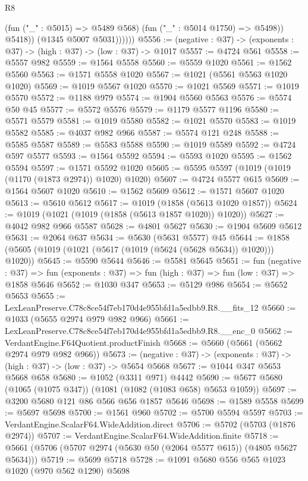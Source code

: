 \begin{lexlean}{R8}
\begin{coremodule}
                    (fun ("_" : @5015) => @5489 @568)
                    (fun ("_" : @5014 @1750) => @5498))
                  @5418))
              (@1345 @5007 @5031))))))
@5556 := (negative : @37) -> (exponents : @37) -> (high : @37) -> (low : @37) -> @1017
@5557 := @4724 @561
@5558 := @5557 @982
@5559 := @1564 @5558
@5560 := @5559 @1020
@5561 := @1562 @5560
@5563 := @1571 @5558 @1020
@5567 := @1021 (@5561 @5563 @1020 @1020)
@5569 := @1019 @5567 @1020
@5570 := @1021 @5569
@5571 := @1019 @5570
@5572 := @1188 @979
@5574 := @1904 @5560 @5563
@5576 := @5574 @50 @45
@5577 := @5572 @5576
@5579 := @1179 @5577 @1196
@5580 := @5571 @5579
@5581 := @1019 @5580
@5582 := @1021 @5570
@5583 := @1019 @5582
@5585 := @4037 @982 @966
@5587 := @5574 @121 @248
@5588 := @5585 @5587
@5589 := @5583 @5588
@5590 := @1019 @5589
@5592 := @4724 @597 @5577
@5593 := @1564 @5592
@5594 := @5593 @1020
@5595 := @1562 @5594
@5597 := @1571 @5592 @1020
@5605 := @5595 @5597 (@1019 (@1019 (@1170 (@1873 @2974)) @1020) @1020)
@5607 := @4724 @5577 @615
@5609 := @1564 @5607 @1020
@5610 := @1562 @5609
@5612 := @1571 @5607 @1020
@5613 := @5610 @5612
@5617 := @1019 (@1858 (@5613 @1020 @1857))
@5624 := @1019 (@1021 (@1019 (@1858 (@5613 @1857 @1020)) @1020))
@5627 := @4042 @982 @966 @5587
@5628 := @4801 @5627
@5630 := @1904 @5609 @5612
@5631 := @2064 @637
@5634 := @5630 (@5631 @5577) @45
@5644 := @1858 (@5605 (@1019 (@1021 (@5617 (@1019 (@5624 (@5628 @5634)) @1020))) @1020))
@5645 := @5590 @5644
@5646 := @5581 @5645
@5651 := fun (negative : @37) =>
  fun (exponents : @37) => fun (high : @37) => fun (low : @37) => @1858 @5646
@5652 := @1030 @347
@5653 := @5129 @986
@5654 := @5652 @5653
@5655 := LexLeanPreserve.C78c8ce54f7eb170d4e955bfd1a5edbb9.R8.__fits_12
@5660 := @1033 (@5655 @2974 @979 @982 @966)
@5661 := LexLeanPreserve.C78c8ce54f7eb170d4e955bfd1a5edbb9.R8.__enc_0
@5662 := VerdantEngine.F64Quotient.productFinish
@5668 := @5660 (@5661 (@5662 @2974 @979 @982 @966))
@5673 := (negative : @37) -> (exponents : @37) -> (high : @37) -> (low : @37) -> @5654 @5668
@5677 := @1044 @347 @5653 @5668 @658
@5680 := @1052 (@3311 @971) @4442
@5690 := @5677 @5680 (@1065 (@1075 @347)) (@1081 (@1082 (@1083 @658) @5653 @1059))
@5697 := @3200 @5680 @121 @86 @566 @656 @1857 @5646
@5698 := @1589 @5558
@5699 := @5697 @5698
@5700 := @1561 @960
@5702 := @5700 @5594 @5597
@5703 := VerdantEngine.ScalarF64.WideAddition.direct
@5706 := @5702 (@5703 (@1876 @2974))
@5707 := VerdantEngine.ScalarF64.WideAddition.finite
@5718 := @5661 (@5706 (@5707 @2974 (@5630 @50 (@2064 @5577 @615)) (@4805 @5627 @5634)))
@5719 := @5699 @5718
@5728 := @1091 @5680 @556 @565 @1023 @1020 (@970 @562 @1290) @5698

\end{coremodule}
\end{lexlean}
